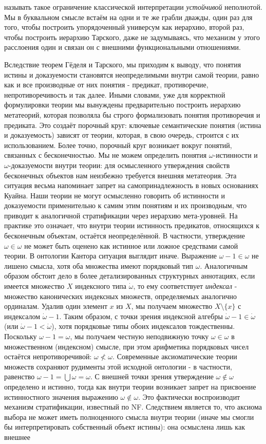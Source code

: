\documentclass[12pt]{article}
\begin{document}
называть такое ограничение классической интерпретации {\it устойчивой} неполнотой. Мы в буквальном смысле встаём на одни и те же грабли дважды, один раз для того, чтобы построить упорядоченный универсум как иерархию, второй раз, чтобы построить иерархию Тарского, даже не задумываясь, что механизм у этого расслоения один и связан он с внешними функциональными отношениями.

Вследствие теорем Гёделя и Тарского, мы приходим к выводу, что понятия истины и доказуемости становятся неопределимыми внутри самой теории, равно как и все производные от них понятия - предикат, противоречие, непротиворечивость и так далее. Иными словами, уже для корректной формулировки теории мы вынуждены предварительно построить иерархию метатеорий, которая позволяла бы строго формализовать понятия противоречия и предиката. Это создаёт порочный круг: ключевые семантические понятия (истина и доказуемость) зависят от теории, которая, в свою очередь, строится с их использованием. Более точно, порочный круг возникает вокруг понятий, связанных с бесконечностью. Мы не можем определить понятия $\omega$-истинности и $\omega$-доказуемости внутри теории: для осмысленного утверждения свойств бесконечных объектов нам неизбежно требуется внешняя метатеория. Эта ситуация весьма напоминает запрет на самопринадлежность в новых основаниях Куайна. Наши теории не могут осмысленно говорить об истинности и доказуемости применительно к самим этим понятиям и их производным, что приводит к аналогичной стратификации через иерархию мета-уровней. На практике это означает, что внутри теории истинность предикатов, относящихся к бесконечным объектам, остаётся неопределённой. В частности, утверждение $\omega \in \omega$ не может быть оценено как истинное или ложное средствами самой теории. В онтологии Кантора ситуация выглядит иначе. Выражение $\omega - 1 \in \omega$ не лишено смысла, хотя оба множества имеют порядковый тип $\omega$. Аналогичным образом обстоит дело в более детализированных структурных аннотациях, если имеется множество $X$ индексного типа $\dot{\omega}$, то ему соответствует {\it индексал} - множество канонических индексных множеств, определяемых аналогично ординалам. Удалив один элемент $x$ из $X$, мы получаем множество $X \setminus \{x\}$ с индексалом $\dot{\omega} - 1$. Таким образом, с точки зрения индексной алгебры $\dot{\omega} - 1 \in \dot{\omega}$ (или $\dot{\omega} - 1 < \dot{\omega}$), хотя порядковые типы обоих индексалов тождественны. Поскольку $\omega - 1 = \omega$, мы получаем честную неподвижную точку $\omega \in \omega$ в множественном (индексном) смысле, при этом арифметика порядковых чисел остаётся непротиворечивой: $\omega \nless \omega$. Современные аксиоматические теории множеств сохраняют рудименты этой исходной онтологии - в частности, равенство $\omega - 1 = \bigcup \omega = \omega$. С внешней точки зрения утверждение $\omega \notin \omega$ определено и истинно, тогда как внутри теории возникает запрет на присвоение истинностного значения выражению $\omega \notin \omega$. Это фактически воспроизводит механизм стратификации, известный по NF. Следствием является то, что аксиома выбора не может иметь полноценного смысла внутри теории (иначе мы смогли бы интерпретировать собственный объект истины): она осмыслена лишь как внешнее 
\end{document}
